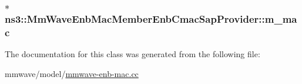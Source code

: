 \subsubsection[{\texorpdfstring{m\+\_\+mac}{m_mac}}]{$\ast$ ns3\+::\+Mm\+Wave\+Enb\+Mac\+Member\+Enb\+Cmac\+Sap\+Provider\+::m\+\_\+mac\hspace{0.3cm}{\ttfamily [private]}}\hypertarget{classns3_1_1MmWaveEnbMacMemberEnbCmacSapProvider_a2c12928a4b945a5e32a7a72b50d31805}{}\label{classns3_1_1MmWaveEnbMacMemberEnbCmacSapProvider_a2c12928a4b945a5e32a7a72b50d31805}


The documentation for this class was generated from the following file\+:\begin{DoxyCompactItemize}
\item 
mmwave/model/\hyperlink{mmwave-enb-mac_8cc}{mmwave-\/enb-\/mac.\+cc}\end{DoxyCompactItemize}
